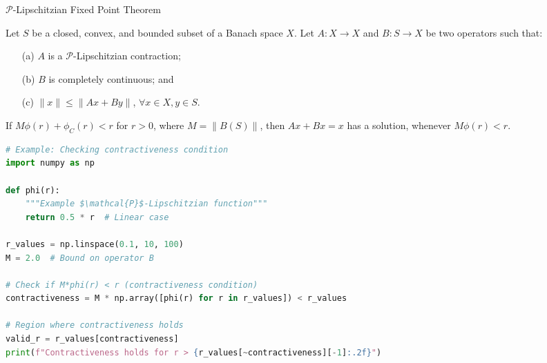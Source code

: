 \documentclass[aspectratio=169,10pt]{beamer}
\begin{document}
\begin{frame}[fragile]{$\mathcal{P}$-Lipschitzian Fixed Point Theorem}
    \begin{theorem}[Theorem 5.184]
        Let $S$ be a closed, convex, and bounded subset of a Banach space $X$.
        Let $A: X \to X$ and $B: S \to X$ be two operators such that:
        \begin{enumerate}
            \item[(a)] $A$ is a $\mathcal{P}$-Lipschitzian contraction;
            \item[(b)] $B$ is completely continuous; and
            \item[(c)] $\|x\| \leq \|Ax + By\|$, $\forall x \in X, y \in S$.
        \end{enumerate}

        If $M\phi(r) + \phi_C(r) < r$ for $r > 0$, where $M = \|B(S)\|$,
        then $Ax + Bx = x$ has a solution, whenever $M\phi(r) < r$.
    \end{theorem}

    \begin{lstlisting}[language=Python, caption=Verification of $\mathcal{P}$-Lipschitzian condition]
# Example: Checking contractiveness condition
import numpy as np

def phi(r):
    """Example $\mathcal{P}$-Lipschitzian function"""
    return 0.5 * r  # Linear case

r_values = np.linspace(0.1, 10, 100)
M = 2.0  # Bound on operator B

# Check if M*phi(r) < r (contractiveness condition)
contractiveness = M * np.array([phi(r) for r in r_values]) < r_values

# Region where contractiveness holds
valid_r = r_values[contractiveness]
print(f"Contractiveness holds for r > {r_values[~contractiveness][-1]:.2f}")
    \end{lstlisting}
\end{frame}
\end{document}
